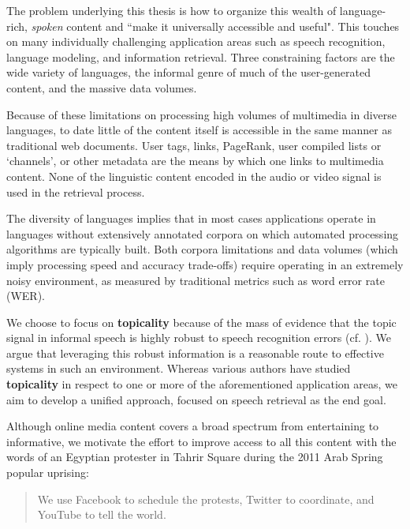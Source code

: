 The problem underlying this thesis is how to organize this wealth of language-rich, \textit{spoken} content and ``make it universally accessible and useful"\cite{googleMission}.  This touches on many individually challenging application areas such as speech recognition, language modeling, and information retrieval.  Three constraining factors are the wide variety of languages,  the informal genre of much of the user-generated content, and the massive data volumes.  

Because of these limitations on processing high volumes of multimedia in diverse languages, to date little of the content itself is accessible in the same manner as traditional web documents.  User tags, links, PageRank, user compiled lists or `channels', or other metadata are the means by which one links to multimedia content.  None of the linguistic content encoded in the audio or video signal is used in the retrieval process.  

The diversity of languages implies that in most cases applications operate in languages without extensively annotated corpora on which automated processing algorithms are typically built.  Both corpora limitations and data volumes (which imply processing speed and accuracy trade-offs) require operating in an extremely noisy environment, as measured by traditional metrics such as word error rate (WER).

We choose to focus on \textbf{topicality} because of the mass of evidence that the topic signal in informal speech is highly robust to speech recognition errors (cf. \cite{wintrode2014}).  We argue that leveraging this robust information is a reasonable route to effective systems in such an environment.  Whereas various authors have studied \textbf{topicality} in respect to one or more of the aforementioned application areas, we aim to develop a unified approach, focused on speech retrieval as the end goal.


Although online media content covers a broad spectrum from entertaining to informative, we motivate the effort to improve access to all this content with the words of an Egyptian protester in Tahrir Square during the 2011 Arab Spring popular uprising:
\begin{quote} 
We use Facebook to schedule the protests, Twitter to coordinate, and YouTube to tell the world\cite{howard2011}.
\end{quote}
  
